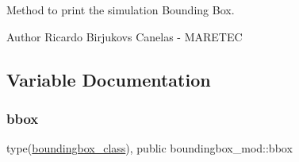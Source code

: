 Method to print the simulation Bounding Box. 

\begin{DoxyAuthor}{Author}
Ricardo Birjukovs Canelas -\/ M\+A\+R\+E\+T\+EC 
\end{DoxyAuthor}


\subsection{Variable Documentation}
\mbox{\label{namespaceboundingbox__mod_a45e98e492bb546328c98f618a74622ec}} 
\subsubsection{\texorpdfstring{bbox}{bbox}}
{\footnotesize\ttfamily type(\hyperlink{structboundingbox__mod_1_1boundingbox__class}{boundingbox\+\_\+class}), public boundingbox\+\_\+mod\+::bbox}

